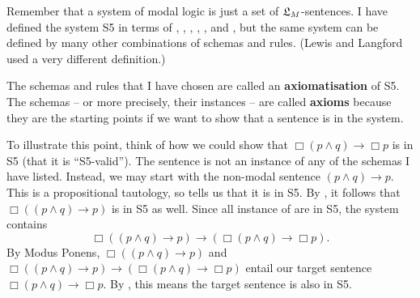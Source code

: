 \begin{solution}
\begin{sollist}

  \end{sollist}
\end{solution}

Remember that a system of modal logic is just a set of $\mathfrak{L}_{M}$-sentences. I
have defined the system S5 in terms of , , , ,
,  and , but the same system can be defined by many
other combinations of schemas and rules. (Lewis and Langford used a very
different definition.)

The schemas and rules that I have chosen are called an \textbf{axiomatisation}
of S5. The schemas -- or more precisely, their instances -- are called
\textbf{axioms} because they are the starting points if we want to show that a
sentence is in the system.


To illustrate this point, think of how we could show that
$\Box(p \land q) \to \Box p$ is in S5 (that it is ``S5-valid''). The sentence is
not an instance of any of the schemas I have listed. Instead, we may start with
the non-modal sentence $(p \land q) \to p$. This is a propositional tautology,
so  tells us that it is in S5. By , it follows that
$\Box((p \land q) \to p)$ is in S5 as well. Since all instance of
 are in S5, the system contains
\[
  \Box((p \land q) \to p) \to (\Box(p \land q) \to \Box p).
\]
By Modus Ponens, $\Box((p \land q) \to p)$ and
$\Box((p \land q) \to p) \to (\Box(p \land q) \to \Box p)$ entail our target
sentence $\Box(p \land q) \to \Box p$. By , this means the target
sentence is also in S5.


